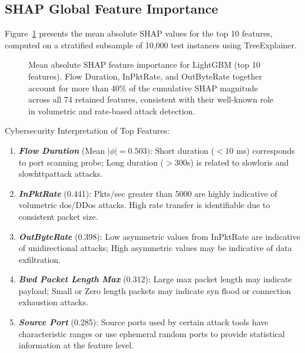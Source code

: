 \subsection{SHAP Global Feature Importance}

Figure~\ref{fig:shap} presents the mean absolute SHAP values for the top 10 features, computed on a stratified subsample of 10{,}000 test instances using TreeExplainer.

\begin{figure}[H]
\centering
{}
\caption{Mean absolute SHAP feature importance for LightGBM (top 10 features). Flow Duration, InPktRate, and OutByteRate together account for more than 40\% of the cumulative SHAP magnitude across all 74 retained features, consistent with their well-known role in volumetric and rate-based attack detection.}
\label{fig:shap}
\end{figure}

Cybersecurity Interpretation of Top Features:
\begin{enumerate}
\item \textit{\textbf{Flow Duration}} (Mean $\mid \phi \mid = 0.503)$: Short duration ($<10$ ms) corresponds to port scanning probe; Long duration ($> 300$s) is related to slowloris and slowhttpattack attacks.
\item \textit{\textbf{InPktRate}} (0.441): Pkts/sec greater than 5000 are highly indicative of volumetric dos/DDos attacks. High rate transfer is identifiable due to consistent packet size.
\item \textit{\textbf{OutByteRate}} (0.398): Low asymmetric values from InPktRate are indicative of unidirectional attacks; High asymmetric values may be indicative of data exfiltration.
\item \textit{\textbf{Bwd Packet Length Max}} (0.312): Large max packet length may indicate payload; Small or Zero length packets may indicate syn flood or connection exhaustion attacks.
\item \textit{\textbf{Source Port}} (0.285): Source ports used by certain attack tools have characteristic ranges or use ephemeral random ports to provide statistical information at the feature level.
\end{enumerate}
